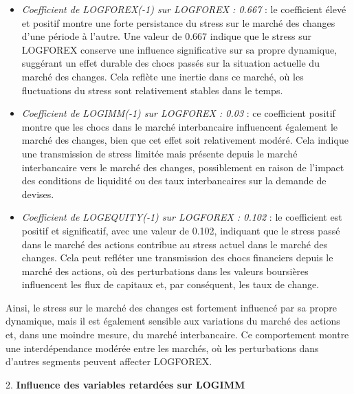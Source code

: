 \begin{itemize}
    \item \textit{Coefficient de LOGFOREX(-1) sur LOGFOREX : 0.667} : le coefficient élevé et positif montre une forte persistance du stress sur le marché des changes d'une période à l'autre. Une valeur de 0.667 indique que le stress sur LOGFOREX conserve une influence significative sur sa propre dynamique, suggérant un effet durable des chocs passés sur la situation actuelle du marché des changes. Cela reflète une inertie dans ce marché, où les fluctuations du stress sont relativement stables dans le temps.
    \item \textit{Coefficient de LOGIMM(-1) sur LOGFOREX : 0.03} : ce coefficient positif montre que les chocs dans le marché interbancaire influencent également le marché des changes, bien que cet effet soit relativement modéré. Cela indique une transmission de stress limitée mais présente depuis le marché interbancaire vers le marché des changes, possiblement en raison de l'impact des conditions de liquidité ou des taux interbancaires sur la demande de devises.
    \item \textit{Coefficient de LOGEQUITY(-1) sur LOGFOREX : 0.102} : le coefficient est positif et significatif, avec une valeur de 0.102, indiquant que le stress passé dans le marché des actions contribue au stress actuel dans le marché des changes. Cela peut refléter une transmission des chocs financiers depuis le marché des actions, où des perturbations dans les valeurs boursières influencent les flux de capitaux et, par conséquent, les taux de change.
\end{itemize}

Ainsi, le stress sur le marché des changes est fortement influencé par sa propre dynamique, mais il est également sensible aux variations du marché des actions et, dans une moindre mesure, du marché interbancaire. Ce comportement montre une interdépendance modérée entre les marchés, où les perturbations dans d'autres segments peuvent affecter LOGFOREX.

\vspace{0.5cm}

2. \textbf{Influence des variables retardées sur LOGIMM}

